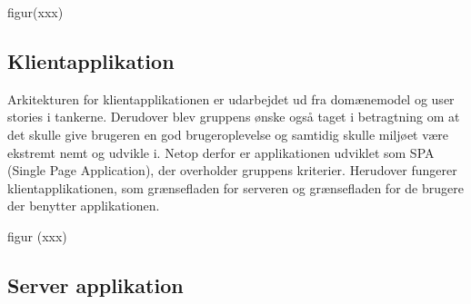 figur(xxx)

\subsection{Klientapplikation}

Arkitekturen for klientapplikationen er udarbejdet ud fra domænemodel og user stories i tankerne. Derudover blev gruppens ønske også taget i betragtning om at det skulle give brugeren en god brugeroplevelse og samtidig skulle miljøet være ekstremt nemt og udvikle i. Netop derfor er applikationen udviklet som SPA (Single Page Application), der overholder gruppens kriterier. Herudover fungerer klientapplikationen, som grænsefladen for serveren og grænsefladen for de brugere der benytter applikationen.

figur (xxx)


\subsection{Server applikation}